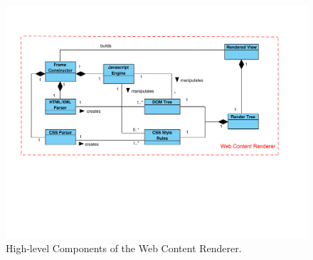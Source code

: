 \documentclass[prodmode,acmtecs]{acmsmall}
\begin{document}
    \begin{figure}[h!t]
      \vspace*{-1.8cm}
      \centering
      \hspace*{-1cm}\includegraphics[scale=0.6]{figures/WebContentRenderer-v2.pdf}
      \vspace*{-4.5cm}
      \caption{High-level Components of the Web Content Renderer.}
      \label{fig:WCR}
    \end{figure}
\end{document}
